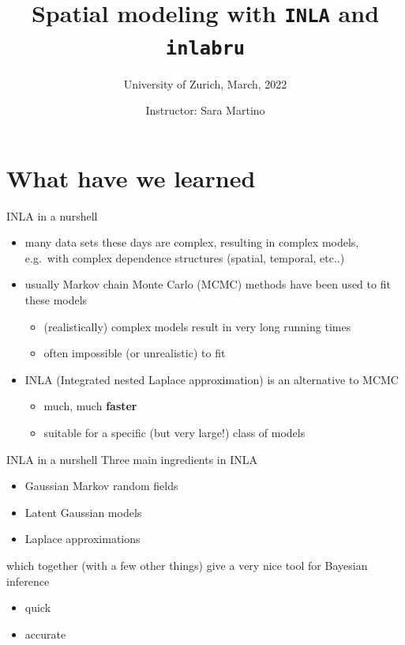 \documentclass[
  ignorenonframetext,
]{beamer}
\title{Spatial modeling with \texttt{INLA} and \texttt{inlabru}}
\subtitle{University of Zurich, March, 2022}
\author{Instructor: Sara Martino}
\date{}
\institute{Department of Mathematical Science (NTNU)}
\begin{document}
\frame{\titlepage}

\begin{frame}[allowframebreaks]
  \tableofcontents[hideallsubsections]
\end{frame}
\begin{frame}
\end{frame}

\hypertarget{what-have-we-learned}{%
\section{What have we learned}\label{what-have-we-learned}}

\begin{frame}{INLA in a nurshell}
\protect\hypertarget{inla-in-a-nurshell}{}
\begin{itemize}
\item
  many data sets these days are complex, resulting in complex models,
  e.g.~with complex dependence structures (spatial, temporal, etc..)
\item
  usually Markov chain Monte Carlo (MCMC) methods have been used to fit
  these models

  \begin{itemize}
  \item
    (realistically) complex models result in very long running times
  \item
    often impossible (or unrealistic) to fit
  \end{itemize}
\item
  INLA (Integrated nested Laplace approximation) is an alternative to
  MCMC

  \begin{itemize}
  \item
    much, much \textbf{faster}
  \item
    suitable for a specific (but very large!) class of models
  \end{itemize}
\end{itemize}
\end{frame}

\begin{frame}{INLA in a nurshell}
\protect\hypertarget{inla-in-a-nurshell-1}{}
Three main ingredients in INLA

\begin{itemize}
\item
  Gaussian Markov random fields
\item
  Latent Gaussian models
\item
  Laplace approximations
\end{itemize}

which together (with a few other things) give a very nice tool for
Bayesian inference

\begin{itemize}
\item
  quick
\item
  accurate
\end{itemize}
\end{frame}
\end{document}
